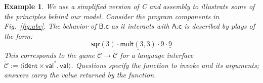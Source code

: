 \documentclass[draft,11pt]{report}
\newtheorem{example}[theorem]{Example}
\theoremstyle{definition}
\newcommand{\kw}[1]{\ensuremath{ \mathsf{#1} }}
\begin{document}
\begin{example} \label{ex:abc} %
We use a simplified version of C and assembly
to illustrate some of the principles behind our model.
Consider the program components in Fig.~\ref{fig:abc}.
The behavior of $\textsf{B.c}$
as it interacts with $\textsf{A.c}$
is described by plays of the form:
\begin{equation} \label{eqn:cplay}
  \mathsf{sqr}(3) \cdot
    \underline{\mathsf{mult}(3,3)} \cdot 9 \cdot \underline{9}
\end{equation}
This corresponds to the game
$\tilde{\mathcal{C}} \rightarrow \tilde{\mathcal{C}}$
for a language interface
$\tilde{\mathcal{C}} :=
 \langle \kw{ident} \times \kw{val}^*, \kw{val} \rangle$.
Questions specify the function to invoke
and its arguments;
answers carry the value returned by the function.


\end{example}
\end{document}
